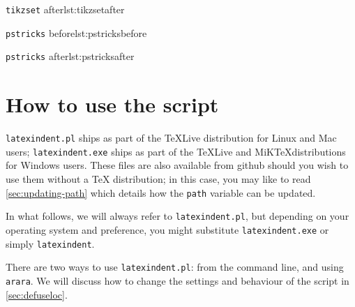 \documentclass[11pt]{article}
\begin{document}
\begin{adjustwidth}{-2cm}{2cm}
\begin{minipage}{.6\textwidth}
\begin{cmhlistings}[style=demo]{\lstinline!tikzset! after}{lst:tikzsetafter}
		\end{cmhlistings}
	\end{minipage}
	\begin{minipage}{.6\textwidth}
		\begin{cmhlistings}[style=demo]{\lstinline!pstricks! before}{lst:pstricksbefore}
\def\Picture#1{%
\def\stripH{#1}%
\begin{pspicture}[showgrid...
\psforeach{\row}{%
{{3,2.8,2.7,3,3.1}},%
{2.8,1,1.2,2,3},%
...
}{%
\expandafter...
}
\end{pspicture}}
		\end{cmhlistings}
	\end{minipage}%
	\begin{minipage}{.6\textwidth}
		\begin{cmhlistings}[style=demo]{\lstinline!pstricks! after}{lst:pstricksafter}
\def\Picture#1{%
	\def\stripH{#1}%
	\begin{pspicture}[showgrid...
		\psforeach{\row}{%
			{{3,2.8,2.7,3,3.1}},%
			{2.8,1,1.2,2,3},%
            ...
			}{%
			\expandafter...
		}
	\end{pspicture}}
		\end{cmhlistings}
	\end{minipage}
\end{adjustwidth}

\section{How to use the script}
\lstinline!latexindent.pl! ships as part of the \TeX Live distribution for
Linux and Mac users; \lstinline!latexindent.exe! ships as part of the \TeX Live
and MiK\TeX distributions for Windows users. These files are also available
from github \cite{latexindent-home} should you wish to use them without
a \TeX{} distribution; in this case, you may like to read \vref{sec:updating-path}
which details how the \lstinline!path! variable can be updated.

In what follows, we will always refer to \lstinline!latexindent.pl!, but depending on
your operating system and preference, you might substitute \lstinline!latexindent.exe! or
simply \lstinline!latexindent!.

There are two ways to use \lstinline!latexindent.pl!: from the command line,
and using \lstinline!arara!.  We will discuss how to change the settings and behaviour
of the script in \cref{sec:defuseloc}.
\end{document}
